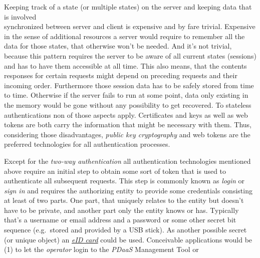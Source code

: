 \documentclass[12pt,english,a4paper,titlepage,cleardoublepage=empty,dottedtoc]{report}
\begin{document}
Keeping track of a state (or multiple states) on the server and keeping
data that is involved\\
synchronized between server and client is expensive and by fare trivial.
Expensive in the sense of additional resources a server would require to
remember all the data for those states, that otherwise won't be needed.
And it's not trivial, because this pattern requires the server to be
aware of all current states (sessions) and has to have them accessible
at all time. This also means, that the contents responses for certain
requests might depend on preceding requests and their incoming order.
Furthermore those session data has to be safely stored from time to
time. Otherwise if the server fails to run at some point, data only
existing in the memory would be gone without any possibility to get
recovered. To stateless authentications non of those aspects apply.
Certificates and keys as well as web tokens are both carry the
information that might be necessary with them. Thus, considering those
disadvantages, \emph{public key cryptography} and web tokens are the
preferred technologies for all authentication processes.

Except for the \emph{two-way authentication} all authentication
technologies mentioned above require an initial step to obtain some sort
of token that is used to authenticate all subsequent requests. This step
is commonly known as \emph{login} or \emph{sign in} and requires the
authorizing entity to provide some credentials consisting at least of
two parts. One part, that uniquely relates to the entity but doesn't
have to be private, and another part only the entity knows or has.
Typically that's a username or email address and a password or some
other secret bit sequence (e.g.~stored and provided by a USB stick). As
another possible secret (or unique object) an
\emph{\protect\hyperlink{link_eid-card}{eID card}} could be used.
Conceivable applications would be (1) to let the \emph{operator} login
to the \emph{PDaaS} Management Tool or
\end{document}
